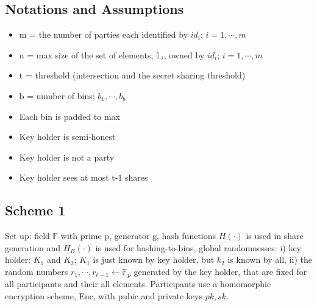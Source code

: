 \subsection{Notations and Assumptions}
\begin{itemize}
    \item m = the number of parties each identified by $id_i$; $i = 1, \cdots, m$
    \item n = max size of the set of elements, $\mathbb{L}_i$, owned by $id_i$; $i = 1, \cdots, m$
    \item t = threshold (intersection and the secret sharing threshold)
    \item b = number of bins; $b_1, \cdots, b_b$
    \item Each bin is padded to max
    \item Key holder is semi-honest
    \item Key holder is not a party
    \item Key holder sees at most t-1 shares
\end{itemize}
\subsection{Scheme 1}
Set up: field $\mathbb{F}$ with prime p, generator g, hash functions $H(\cdot)$ is used in share generation and $H_B(\cdot)$ is used for hashing-to-bins, global randomnesses: i) key holder: $K_1$ and $K_2$; $K_1$ is just known by key holder, but $k_2$ is known by all, ii) the random numbers $r_1, \cdots, r_{t-1} \gets \mathbb{F}_p$ generated by the key holder, that are fixed for all participants and their all elements. Participants use a homomorphic encryption scheme, Enc, with pubic and private keys $pk, sk$.
